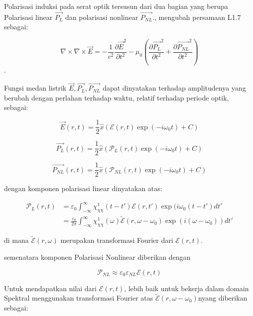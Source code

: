 Polarisasi induksi pada serat optik tersusun dari dua bagian yang berupa Polarisasi linear \(\vec{P_L}\) dan polarisasi nonlinear \(\vec{P_{NL}}\)., mengubah persamaan L1.7 sebagai:

\begin{equation}
    \nabla \times \nabla \times \vec{E} = -\frac{1}{c^2}\frac{\partial \vec{E}^2}{\partial t^2} - \mu_0 \left( \frac{\partial \vec{P_L}^2}{\partial t^2} + \frac{\partial \vec{P_{NL}}^2}{\partial t^2} \right)
\end{equation}.

Fungsi medan listrik \(\vec{E}, \vec{P_L}, \vec{P_{NL}}\) dapat dinyatakan terhadap amplitudenya yang berubah dengan perlahan terhadap waktu, relatif terhadap periode optik, sebagai: 

\begin{equation}
    \vec{E}(r,t) = \frac{1}{2}\hat{x}(\mathcal{E}(r,t)\exp(-i\omega_0t)+C)
\end{equation}

\begin{equation}
    \vec{P_L}(r,t) = \frac{1}{2}\hat{x}(\mathcal{P}_L(r,t)\exp(-i\omega_0t)+C)
\end{equation}

\begin{equation}
    \vec{P_{NL}}(r,t) = \frac{1}{2}\hat{x}(\mathcal{P}_{NL}(r,t)\exp(-i\omega_0t)+C)
\end{equation}

dengan komponen polarisasi linear dinyatakan atas: 

\begin{align}
    \mathcal{P}_L(r,t) &= \varepsilon_0 \int_{-\infty}^\infty \chi_{\chi\chi}^1(t-t')\mathcal{E}(r,t')\exp(i\omega_0(t-t') dt' \\
    &= \frac{\varepsilon_0}{2\pi}\int_{-\infty}^\infty \chi_{\chi\chi}^1(\omega)\tilde{\mathcal{E}}(r,\omega-\omega_0)\exp(i(\omega-\omega_0)) dt'
\end{align}

di mana \(\tilde{\mathcal{E}}(r,\omega)\) merupakan transformasi Fourier dari \(\mathcal{E}(r,t)\).

semenatara komponen Polarisasi Nonlinear diberikan dengan 

\begin{equation}
    \mathcal{P}_{NL} \approx \varepsilon_0 \varepsilon_{NL} \mathcal{E}(r,t)
\end{equation}

Untuk mendapatkan nilai dari \(\mathcal{E}(r,t)\), lebih baik untuk bekerja dalam domain Spektral menggunakan transformasi Fourier atas \(\tilde{\mathcal{E}}(r,\omega-\omega_0)\)nyang diberikan sebagai: 

